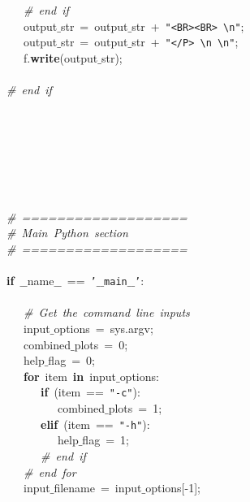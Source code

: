 \mbox{}\ \ \ \textit{\#\ end\ if} \\
\mbox{}\ \ \ output$\_$str\ =\ output$\_$str\ +\ \texttt{"{}\textless{}BR\textgreater{}\textless{}BR\textgreater{}\ \textbackslash{}n"{}}; \\
\mbox{}\ \ \ output$\_$str\ =\ output$\_$str\ +\ \texttt{"{}\textless{}/P\textgreater{}\ \textbackslash{}n\ \textbackslash{}n"{}}; \\
\mbox{}\ \ \ f.\textbf{write}(output$\_$str); \\
\mbox{}\ \ \  \\
\mbox{}\textit{\#\ end\ if} \\
\mbox{} \\
\mbox{} \\
\mbox{} \\
\mbox{} \\
\mbox{} \\
\mbox{} \\
\mbox{} \\
\mbox{}\textit{\#\ ===================} \\
\mbox{}\textit{\#\ Main\ Python\ section} \\
\mbox{}\textit{\#\ ===================} \\
\mbox{} \\
\mbox{}\textbf{if}\ $\_$$\_$name$\_$$\_$\ ==\ \texttt{'$\_$$\_$main$\_$$\_$'}: \\
\mbox{} \\
\mbox{}\ \ \ \textit{\#\ Get\ the\ command\ line\ inputs} \\
\mbox{}\ \ \ input$\_$options\ =\ sys.argv; \\
\mbox{}\ \ \ combined$\_$plots\ =\ 0; \\
\mbox{}\ \ \ help$\_$flag\ =\ 0; \\
\mbox{}\ \ \ \textbf{for}\ item\ \textbf{in}\ input$\_$options: \\
\mbox{}\ \ \ \ \ \ \textbf{if}\ (item\ ==\ \texttt{"{}-c"{}}): \\
\mbox{}\ \ \ \ \ \ \ \ \ combined$\_$plots\ =\ 1; \\
\mbox{}\ \ \ \ \ \ \textbf{elif}\ (item\ ==\ \texttt{"{}-h"{}}): \\
\mbox{}\ \ \ \ \ \ \ \ \ help$\_$flag\ =\ 1; \\
\mbox{}\ \ \ \ \ \ \textit{\#\ end\ if} \\
\mbox{}\ \ \ \textit{\#\ end\ for} \\
\mbox{}\ \ \ input$\_$filename\ =\ input$\_$options[-1]; \\
\mbox{}\ \ \  \\
